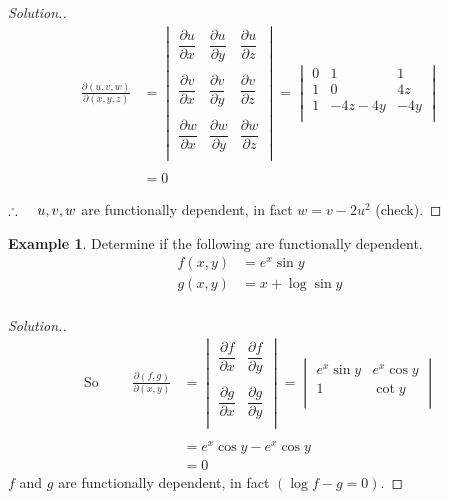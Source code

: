 \documentclass[11pt,a4paper]{article}
\theoremstyle{definition}
\newtheorem{exa}[thm]{Example}
\newenvironment{solution}
  {\renewcommand{\qedsymbol}{}\begin{proof}[\textit{Solution}.]}
  {\end{proof}}
\begin{document}
\begin{solution}
\begin{align*}
\frac{\partial (u,v,w)}{\partial (x,y,z)} & = \begin{vmatrix}
\dfrac{\partial u}{\partial x} & \dfrac{\partial u}{\partial y} & \dfrac{\partial u}{\partial z}\\\\
\dfrac{\partial v}{\partial x} & \dfrac{\partial v}{\partial y} & \dfrac{\partial v}{\partial z}\\\\
\dfrac{\partial w}{\partial x} & \dfrac{\partial w}{\partial y} & \dfrac{\partial w}{\partial z}\\
\end{vmatrix}
= \begin{vmatrix}
0 & 1 & 1\\
1 & 0 & 4z\\
1 & -4z - 4y & -4y\\
\end{vmatrix}\\\\
& = 0
\end{align*}

$\therefore\hspace{0.4cm} u,v,w$ are functionally dependent, in fact $w = v - 2u^2$ (check).
\end{solution}


\begin{exa}


Determine if the following are functionally dependent.
\begin{align*}
f(x,y) & = e^x \sin y\\
g(x,y) & = x + \log \sin y\\
\end{align*}
\end{exa}

\begin{solution}
\begin{align*}
\text{So}\hspace{1cm} \frac{\partial (f,g)}{\partial (x,y)} & = \begin{vmatrix}
\dfrac{\partial f}{\partial x} & \dfrac{\partial f}{\partial y}\\\\
\dfrac{\partial g}{\partial x} & \dfrac{\partial g}{\partial y}\\ 
\end{vmatrix} = \begin{vmatrix}
e^x\sin y & e^x\cos y\\
1 & \cot y\\
\end{vmatrix}\\\\
& = e^x\cos y - e^x\cos y\\
& = 0
\end{align*}
$f$ and $g$ are functionally dependent, in fact $(\log f - g = 0)$.


\pagebreak
\end{solution}
\end{document}
